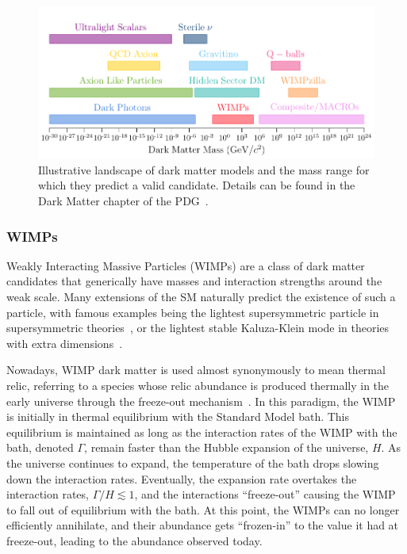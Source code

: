 \begin{figure}[t!]
    \centering
    \includegraphics{DM_model_landscape}
    \caption{Illustrative landscape of dark matter models and the mass range for which they predict a valid candidate. Details can be found in the Dark Matter chapter of the PDG~\cite{ParticleDataGroup:2022pth_aug_ReviewParticlePhysics}.}
    \label{fig:DM_models_landscape}
\end{figure}

\subsubsection*{WIMPs}
Weakly Interacting Massive Particles (WIMPs) are a class of dark matter candidates that generically have masses and interaction strengths around the weak scale. Many extensions of the SM naturally predict the existence of such a particle, with famous examples being the lightest supersymmetric particle in supersymmetric theories~\cite{Goldberg:1983nd_ConstraintPhotinoMass}, or the lightest stable Kaluza-Klein mode in theories with extra dimensions~\cite{Kolb:1983fm_DimensionalReductionEarly}. 

Nowadays, WIMP dark matter is used almost synonymously to mean thermal relic, referring to a species whose relic abundance is produced thermally in the early universe through the freeze-out mechanism~\cite{Jungman:1995df_Supersymmetricdarkmatter}.
In this paradigm, the WIMP is initially in thermal equilibrium with the Standard Model bath. This equilibrium is maintained as long as the interaction rates of the WIMP with the bath, denoted $\Gamma$, remain faster than the Hubble expansion of the universe, $H$. As the universe continues to expand, the temperature of the bath drops slowing down the interaction rates. Eventually, the expansion rate overtakes the interaction rates, $\Gamma/H\lesssim 1$, and the interactions ``freeze-out'' causing the WIMP to fall out of equilibrium with the bath. At this point, the WIMPs can no longer efficiently annihilate, and their abundance gets ``frozen-in'' to the value it had at freeze-out, leading to the abundance observed today. 


